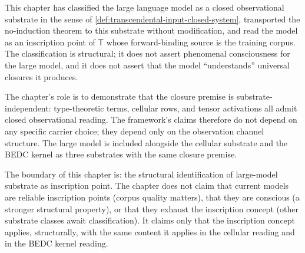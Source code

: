 This chapter has classified the large language model as a closed observational substrate in the sense of \autoref{def:transcendental-input-closed-system}, transported the no-induction theorem to this substrate without modification, and read the model as an inscription point of $\mathsf{T}$ whose forward-binding source is the training corpus. The classification is structural; it does not assert phenomenal consciousness for the large model, and it does not assert that the model ``understands'' universal closures it produces.

The chapter's role is to demonstrate that the closure premise is substrate-independent: type-theoretic terms, cellular rows, and tensor activations all admit closed observational reading. The framework's claims therefore do not depend on any specific carrier choice; they depend only on the observation channel structure. The large model is included alongside the cellular substrate and the BEDC kernel as three substrates with the same closure premise.

The boundary of this chapter is: the structural identification of large-model substrate as inscription point. The chapter does not claim that current models are reliable inscription points (corpus quality matters), that they are conscious (a stronger structural property), or that they exhaust the inscription concept (other substrate classes await classification). It claims only that the inscription concept applies, structurally, with the same content it applies in the cellular reading and in the BEDC kernel reading.

